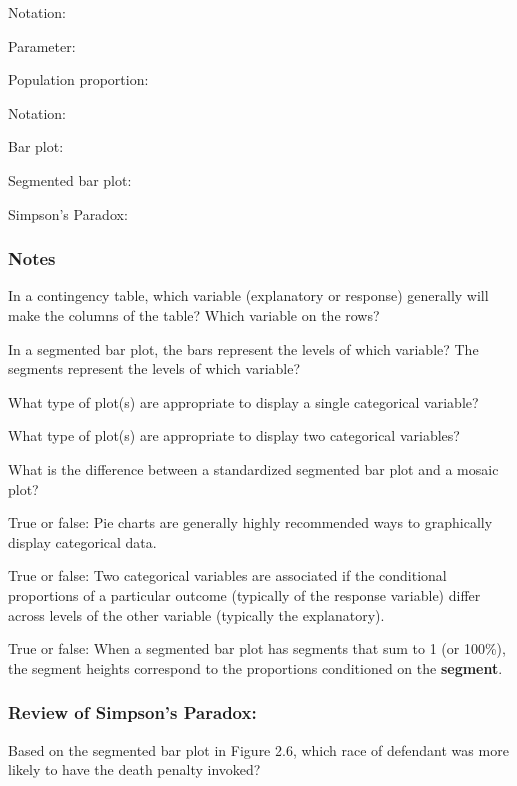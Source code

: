 \documentclass[
]{report}
\newcommand{\rgs}{\vspace{12pt}} %
\newcommand{\rgi}{\hspace{24pt}}  %
\begin{document}
\rgi \rgi Notation:
\rgs

Parameter:
\rgs

\rgi Population proportion:
\rgs

\rgi \rgi Notation:
\rgs

Bar plot:
\rgs

Segmented bar plot:
\rgs

Simpson's Paradox:
\rgs

\hypertarget{notes-4}{%
\subsubsection*{Notes}\label{notes-4}}

In a contingency table, which variable (explanatory or response) generally will make the columns of the table? Which variable on the rows?
\rgs

In a segmented bar plot, the bars represent the levels of which variable? The segments represent the levels of which variable?
\rgs

What type of plot(s) are appropriate to display a single categorical variable?
\rgs

What type of plot(s) are appropriate to display two categorical variables?
\rgs

What is the difference between a standardized segmented bar plot and a mosaic plot?
\rgs

True or false: Pie charts are generally highly recommended ways to graphically display categorical data.

True or false: Two categorical variables are associated if the conditional proportions of a particular outcome (typically of the response variable) differ across levels of the other variable (typically the explanatory).

True or false: When a segmented bar plot has segments that sum to 1 (or 100\%), the segment heights correspond to the proportions conditioned on the \textbf{segment}.

\hypertarget{review-of-simpsons-paradox}{%
\subsubsection*{Review of Simpson's Paradox:}\label{review-of-simpsons-paradox}}

Based on the segmented bar plot in Figure 2.6, which race of defendant was more likely to have the death penalty invoked?
\rgs
\end{document}
